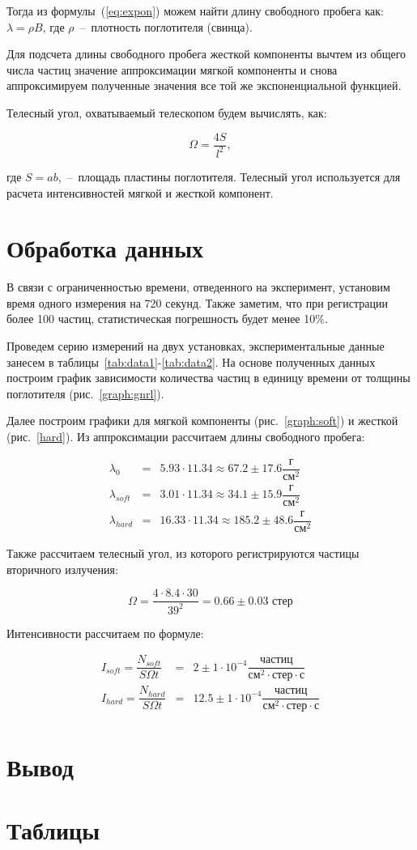 \documentclass[reprint, nofootinbib, nobalancelastpage, 10pt]{revtex4-2}
\begin{document}
Тогда из формулы~(\ref{eq:expon}) можем найти длину свободного пробега как:
$\lambda = \rho B$, где $\rho$~--~плотность поглотителя (свинца).

Для подсчета длины свободного пробега жесткой компоненты вычтем из общего числа частиц
значение аппроксимации мягкой компоненты и снова аппроксимируем полученные значения все
той же экспоненциальной функцией.

Телесный угол, охватываемый телескопом будем вычислять, как:

\[ \Omega = \dfrac{4S}{l^2}, \]

где $S = ab$,~--~площадь пластины поглотителя. Телесный угол используется для расчета
интенсивностей мягкой и жесткой компонент.


\section*{Обработка данных}

В связи с ограниченностью времени, отведенного на эксперимент, установим время одного
измерения на 720 секунд. Также заметим, что при регистрации более 100 частиц,
статистическая погрешность будет менее 10\%.

Проведем серию измерений на двух установках, экспериментальные данные занесем в
таблицы~\ref{tab:data1}-\ref{tab:data2}. На основе полученных данных построим график
зависимости количества частиц в единицу времени от толщины поглотителя
(рис.~\ref{graph:gnrl}).

Далее построим графики для мягкой компоненты (рис.~\ref{graph:soft}) и жесткой
(рис.~\ref{hard}). Из аппроксимации рассчитаем длины свободного пробега:

\begin{eqnarray*}
	\lambda_0 &=& 5.93 \cdot 11.34 \approx 67.2 \pm 17.6 \dfrac{\text{г}}{\text{см}^2}\\
	\lambda_{soft} &=& 3.01 \cdot 11.34 \approx 34.1 \pm 15.9 \dfrac{\text{г}}{\text{см}^2}\\
	\lambda_{hard} &=& 16.33 \cdot 11.34 \approx 185.2 \pm 48.6 \dfrac{\text{г}}{\text{см}^2}
\end{eqnarray*}

Также рассчитаем телесный угол, из которого регистрируются частицы вторичного излучения:

\[ \Omega = \dfrac{4 \cdot 8.4 \cdot 30}{39^2} = 0.66 \pm 0.03 \text{ стер} \]

Интенсивности рассчитаем по формуле:

\begin{eqnarray*}
	I_{soft} = \dfrac{N_{soft}}{S \Omega t} &=& 2 \pm 1 \cdot 10^{-4}
		\dfrac{\text{частиц}}{\text{см}^2 \cdot \text{стер} \cdot \text{с}} \\
	I_{hard} = \dfrac{N_{hard}}{S \Omega t} &=& 12.5 \pm 1 \cdot 10^{-4}
		\dfrac{\text{частиц}}{\text{см}^2 \cdot \text{стер} \cdot \text{с}} \\
\end{eqnarray*}

\section*{Вывод}



\appendix

\section*{Таблицы}



\end{document}
